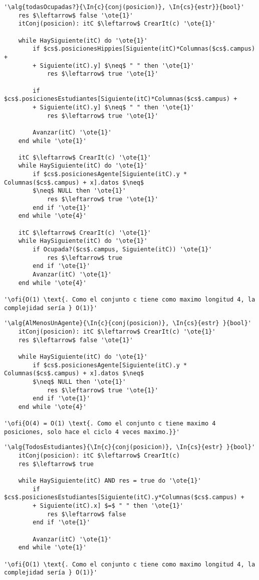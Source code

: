 \begin{lstlisting}[mathescape]
'\alg{todasOcupadas?}{\In{c}{conj(posicion)}, \In{cs}{estr}}{bool}'
	res $\leftarrow$ false '\ote{1}'
	itConj(posicion): itC $\leftarrow$ CrearIt(c) '\ote{1}'

	while HaySiguiente(itC) do '\ote{1}'
		if $cs$.posicionesHippies[Siguiente(itC)*Columnas($cs$.campus) +
		+ Siguiente(itC).y] $\neq$ " " then '\ote{1}'
			res $\leftarrow$ true '\ote{1}'

		if $cs$.posicionesEstudiantes[Siguiente(itC)*Columnas($cs$.campus) +
		+ Siguiente(itC).y] $\neq$ " " then '\ote{1}'
			res $\leftarrow$ true '\ote{1}'

		Avanzar(itC) '\ote{1}'
	end while '\ote{1}'

	itC $\leftarrow$ CrearIt(c) '\ote{1}'
	while HaySiguiente(itC) do '\ote{1}'
		if $cs$.posicionesAgente[Siguiente(itC).y * Columnas($cs$.campus) + x].datos $\neq$
		$\neq$ NULL then '\ote{1}'
			res $\leftarrow$ true '\ote{1}'
		end if '\ote{1}'
	end while '\ote{4}'

	itC $\leftarrow$ CrearIt(c) '\ote{1}'
	while HaySiguiente(itC) do '\ote{1}'
		if Ocupada?($cs$.campus, Siguiente(itC)) '\ote{1}'
			res $\leftarrow$ true
		end if '\ote{1}'
		Avanzar(itC) '\ote{1}'
	end while '\ote{4}'

'\ofi{O(1) \text{. Como el conjunto c tiene como maximo longitud 4, la complejidad sería } O(1)}'
\end{lstlisting}

\begin{lstlisting}[mathescape]
'\alg{AlMenosUnAgente}{\In{c}{conj(posicion)}, \In{cs}{estr} }{bool}'
	itConj(posicion): itC $\leftarrow$ CrearIt(c) '\ote{1}'
	res $\leftarrow$ false '\ote{1}'

	while HaySiguiente(itC) do '\ote{1}'
		if $cs$.posicionesAgente[Siguiente(itC).y * Columnas($cs$.campus) + x].datos $\neq$
		$\neq$ NULL then '\ote{1}'
			res $\leftarrow$ true '\ote{1}'
		end if '\ote{1}'
	end while '\ote{4}'

'\ofi{O(4) = O(1) \text{. Como el conjunto c tiene maximo 4 posiciones, solo hace el ciclo 4 veces maximo.}}'
\end{lstlisting}

\begin{lstlisting}[mathescape]
'\alg{TodosEstudiantes}{\In{c}{conj(posicion)}, \In{cs}{estr} }{bool}'
	itConj(posicion): itC $\leftarrow$ CrearIt(c)
	res $\leftarrow$ true

	while HaySiguiente(itC) AND res = true do '\ote{1}'
		if $cs$.posicionesEstudiantes[Siguiente(itC).y*Columnas($cs$.campus) +
		+ Siguiente(itC).x] $=$ " " then '\ote{1}'
			res $\leftarrow$ false
		end if '\ote{1}'

		Avanzar(itC) '\ote{1}'
	end while '\ote{1}'

'\ofi{O(1) \text{. Como el conjunto c tiene como maximo longitud 4, la complejidad sería } O(1)}'
\end{lstlisting}

